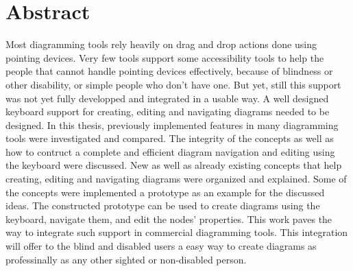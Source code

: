 \chapter*{Abstract}
\beginchapter
\begin{comment}
The abstract is a very important and obligatory part of the report
allowing the potential reader to judge, if he is the target of this
report.  The abstract should be written with broadly understandable
technical language and should be self-contained, i.e. should not
contain any references or citations. Also the usage of abbreviations
and acronyms should be avoided, since the same acronyms or
abbreviations can have different meanings on different research
fields.  The abstract should typically contain about 300 words and in
any cases not more than one page.  The definition of the research
field and the most important outcome of the presented research are the
obligatory components of the abstract.
\end{comment}

\vspace{2cm}

\begin{spacing}{1.5}
Most diagramming tools rely heavily on drag and drop actions done using pointing devices. Very few tools support some accessibility tools to help the people that cannot handle pointing devices effectively, because of blindness or other disability, or simple people who don't have one. But yet, still this support was not yet fully developped and integrated in a usable way. A well designed keyboard support for creating, editing and navigating diagrams needed to be designed. In this thesis, previously implemented features in many diagramming tools were investigated and compared. The integrity of the concepts as well as how to contruct a complete and efficient diagram navigation and editing using the keyboard were discussed. New as well as already existing concepts that help creating, editing and navigating diagrams were organized and explained. Some of the concepts were implemented a prototype as an example for the discussed ideas. The constructed prototype can be used to create diagrams using the keyboard, navigate them, and edit the nodes' properties. This work paves the way to integrate such support in commercial diagramming tools. This integration will offer to the blind and disabled users a easy way to create diagrams as professinally as any other sighted or non-disabled person.
\end{spacing}